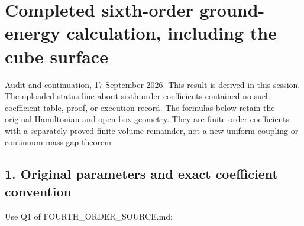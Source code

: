 \documentclass[11pt,a4paper]{article}
\let\originalsection\section
\renewcommand{\section}{\clearpage\originalsection}
\renewcommand{\[}{\begingroup\small\originaldisplaystart}
\renewcommand{\]}{\originaldisplayend\endgroup}
\begin{document}
\section{Completed sixth-order ground-energy calculation, including the
cube
surface}\label{completed-sixth-order-ground-energy-calculation-including-the-cube-surface}

Audit and continuation, 17 September 2026. This result is derived in
this session. The uploaded status line about sixth-order coefficients
contained no such coefficient table, proof, or execution record. The
formulas below retain the original Hamiltonian and open-box geometry.
They are finite-order coefficients with a separately proved
finite-volume remainder, not a new uniform-coupling or continuum
mass-gap theorem.

\subsection{1. Original parameters and exact coefficient
convention}\label{original-parameters-and-exact-coefficient-convention}

Use Q1 of
{\ttfamily F\allowbreak{}O\allowbreak{}U\allowbreak{}R\allowbreak{}T\allowbreak{}H\allowbreak{}\_\allowbreak{}O\allowbreak{}R\allowbreak{}D\allowbreak{}E\allowbreak{}R\allowbreak{}\_\allowbreak{}S\allowbreak{}O\allowbreak{}U\allowbreak{}R\allowbreak{}C\allowbreak{}E\allowbreak{}.\allowbreak{}m\allowbreak{}d\allowbreak{}}:
\end{document}
